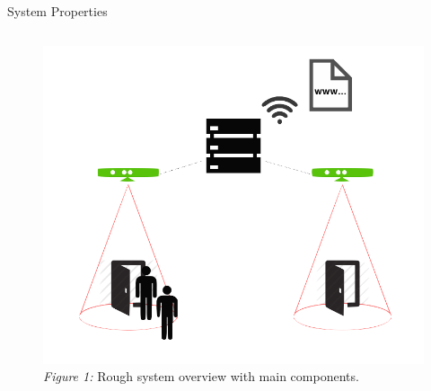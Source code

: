 \documentclass[final,hyperref={pdfpagelabels=false}]{beamer}
\begin{document}
\begin{frame}[t]
\begin{columns}[t]
\begin{column}{.465\textwidth}
\begin{block}{
\vspace*{-0.002\textheight}
System Properties
}
\begin{columns}
		\begin{column}{.43\textwidth} %
			\centering
			\begin{figure}
				\includegraphics[width=0.9\linewidth]{system_overview.png}
				\caption{\centering \textit{Figure 1:} Rough system overview with main components.}
			\end{figure}
		\end{column}
	\end{columns} %

\end{block}



\end{column}
\end{columns}
\end{frame}
\end{document}
